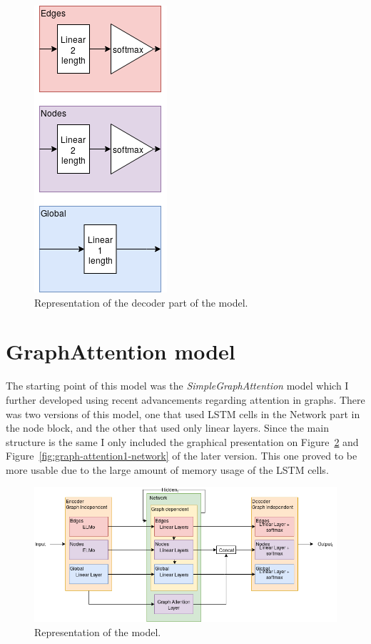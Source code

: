\begin{figure}[!ht]
	\centering
	\includegraphics[scale=0.5]{figures/GA0_decoder.png}
	\caption{Representation of the decoder part of the model.}
	\label{fig:graph-attention0-decoder}
\end{figure}

\section{GraphAttention model}
The starting point of this model was the \textit{SimpleGraphAttention} model which I further developed using recent advancements regarding attention in graphs. There was two versions of this model, one that used LSTM cells in the Network part in the node block, and the other that used only linear layers. Since the main structure is the same I only included the graphical presentation on Figure~\ref{fig:graph-attention1} and Figure~\ref{fig:graph-attention1-network} of the later version. This one proved to be more usable due to the large amount of memory usage of the LSTM cells.

\begin{figure}[!ht]
	\centering
	\includegraphics[width=150mm, keepaspectratio]{figures/GA1.png}
	\caption{Representation of the model.}
	\label{fig:graph-attention1}
\end{figure}


